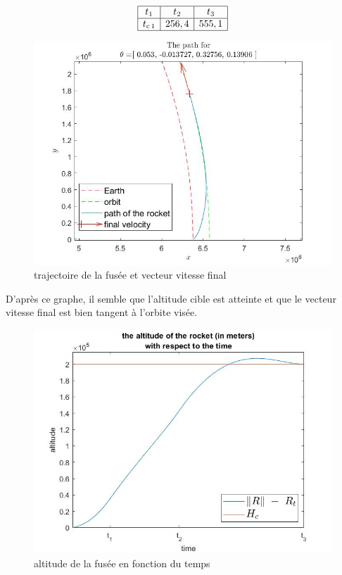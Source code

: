 \[\begin{array}{|c|c|c|}\hline
t_{1} & t_{2} & t_{3}\\\hline
t_{\mathrm{c}\,1} & 256,4 & 555,1\\\hline
\end{array}\]

\clearpage
\begin{center}
\begin{figure}[htbp]
\includegraphics[scale=0.65]{./graphs/path.jpg}
\caption{trajectoire de la fusée et vecteur vitesse final}
\end{figure}
\end{center}

D'après ce graphe, il semble que l'altitude cible est atteinte et que le vecteur vitesse final est bien tangent à l'orbite visée.

\clearpage
\begin{center}
\begin{figure}[t]
\includegraphics[scale=0.65]{./graphs/altitude.jpg}
\caption{altitude de la fusée en fonction du temps}
\end{figure}
\end{center}

